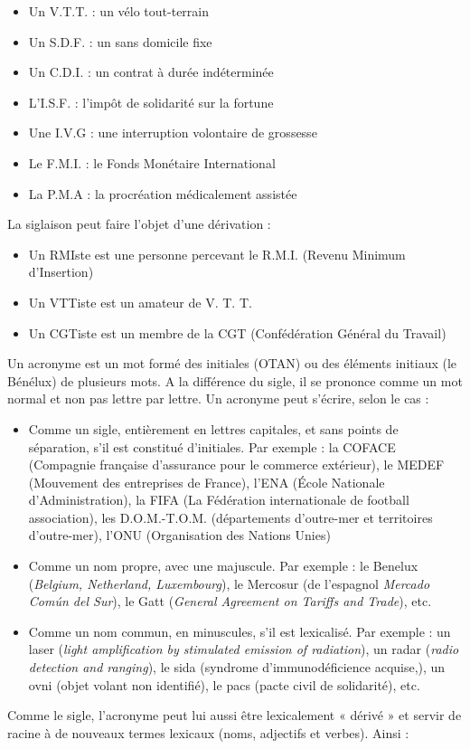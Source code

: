 \begin{itemize}
\item Un V.T.T. : un vélo tout-terrain
\item Un S.D.F. : un sans domicile fixe
\item Un C.D.I. : un contrat à durée indéterminée
\item L’I.S.F. : l’impôt de solidarité sur la fortune
\item Une I.V.G : une interruption volontaire de grossesse
\item Le F.M.I. : le Fonds Monétaire International
\item La P.M.A : la procréation médicalement assistée
\end{itemize}
La siglaison peut faire l’objet d’une dérivation :
\begin{itemize}
\item Un RMIste est une personne percevant le R.M.I. (Revenu Minimum d’Insertion)
\item Un VTTiste est un amateur de V. T. T.
\item Un CGTiste est un membre de la CGT (Confédération Général du Travail)
\end{itemize}

Un acronyme est un mot formé des initiales (OTAN) ou des éléments initiaux (le Bénélux) de plusieurs mots. A la différence du sigle, il se prononce comme un mot normal et non pas lettre par lettre. Un acronyme peut s’écrire, selon le cas :
\begin{itemize}
\item Comme un sigle, entièrement en lettres capitales, et sans points de séparation, s’il est constitué d’initiales. Par exemple : la COFACE (Compagnie française d’assurance pour le commerce extérieur), le MEDEF (Mouvement des entreprises de France), l’ENA (École Nationale d’Administration), la FIFA (La Fédération internationale de football association), les D.O.M.-T.O.M. (départements d’outre-mer et territoires d’outre-mer), l’ONU (Organisation des Nations Unies)
\item Comme un nom propre, avec une majuscule. Par exemple : le Benelux (\textit{Belgium, Netherland, Luxembourg}), le Mercosur (de l’espagnol \textit{Mercado Común del Sur}), le Gatt (\textit{General Agreement on Tariffs and Trade}), etc.
\item Comme un nom commun, en minuscules, s’il est lexicalisé. Par exemple : un laser (\textit{light amplification by stimulated emission of radiation}), un radar (\textit{radio detection and ranging}), le sida (syndrome d’immunodéficience acquise,), un ovni (objet volant non identifié), le pacs (pacte civil de solidarité), etc.
\end{itemize}
Comme le sigle, l’acronyme peut lui aussi être lexicalement « dérivé » et servir de racine à de nouveaux termes lexicaux (noms, adjectifs et verbes). Ainsi :

